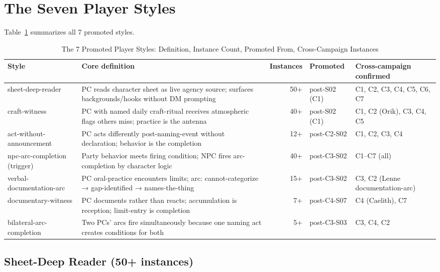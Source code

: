
\section{The Seven Player Styles}
\label{sec:styles}

Table~\ref{tab:styles-summary} summarizes all 7 promoted styles.

\begin{table}[t]
\caption{The 7 Promoted Player Styles: Definition, Instance Count, Promoted From, Cross-Campaign Instances}
\label{tab:styles-summary}
\begin{tabular}{@{}lp{4cm}rp{2cm}p{3.5cm}@{}}
\toprule
Style & Core definition & Instances & Promoted & Cross-campaign confirmed \\
\midrule
sheet-deep-reader & PC reads character sheet as live agency source; surfaces backgrounds/hooks without DM prompting & 50+ & post-S02 (C1) & C1, C2, C3, C4, C5, C6, C7 \\
craft-witness & PC with named daily craft-ritual receives atmospheric flags others miss; practice is the antenna & 40+ & post-S02 (C1) & C1, C2 (Orik), C3, C4, C5 \\
act-without-announcement & PC acts differently post-naming-event without declaration; behavior is the completion & 12+ & post-C2-S02 & C1, C2, C3, C4 \\
npc-arc-completion (trigger) & Party behavior meets firing condition; NPC fires arc-completion by character logic & 40+ & post-C3-S02 & C1--C7 (all) \\
verbal-documentation-arc & PC oral-practice encounters limits; arc: cannot-categorize → gap-identified → names-the-thing & 15+ & post-C3-S02 & C3, C2 (Lenne documentation-arc) \\
documentary-witness & PC documents rather than reacts; accumulation is reception; limit-entry is completion & 7+ & post-C4-S07 & C4 (Caelith), C7 \\
bilateral-arc-completion & Two PCs' arcs fire simultaneously because one naming act creates conditions for both & 5+ & post-C3-S03 & C3, C4, C2 \\
\bottomrule
\end{tabular}
\end{table}

\subsection{Sheet-Deep Reader (50+ instances)}

